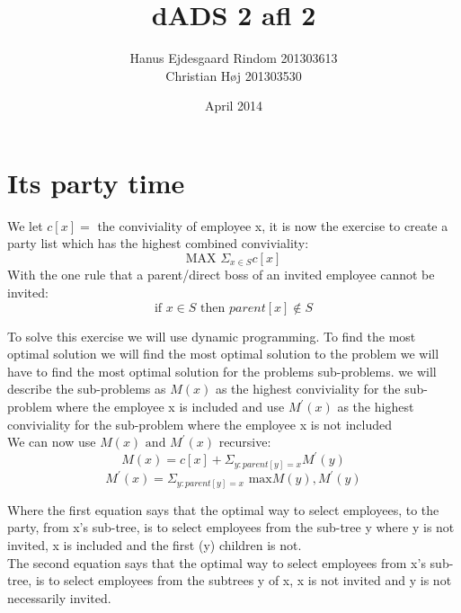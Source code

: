 \documentclass{article}
\title{dADS 2 afl 2}
\author{Hanus Ejdesgaard Rindom 201303613\\
Christian Høj 201303530}
\date{April 2014}
\begin{document}
\maketitle

\section{Its party time}
We let $ c[x]= $ the conviviality of employee x, it is now the exercise to create a party list which has the highest combined conviviality:
$$ \text{MAX } \Sigma _{x \in S} c[x] $$
With the one rule that a parent/direct boss of an invited employee cannot be invited:
$$ \text{if } x \in S \text{ then } parent[x] \notin S $$

To solve this exercise we will use dynamic programming. To find the most optimal solution we will find the most optimal solution to the problem we will have to find the most optimal solution for the problems sub-problems.
we will describe the sub-problems as $ M(x) $ as the highest conviviality for the sub-problem where the employee x is included and use $ M^{'}(x) $  as the highest conviviality for the sub-problem where the employee x is not included\\
We can now use $ M(x) \text{ and } M^{'}(x) $ recursive:
$$ M(x) = c[x] + \Sigma _{y:parent[y] = x} M^{'}(y) $$
$$ M^{'}(x) = \Sigma _{y:parent[y] = x} \text{ max} { M(y),M^{'}(y) } $$

Where the first equation says that the optimal way to select employees, to the party, from x's sub-tree, is to select employees from the sub-tree y where y is not invited, x is included and the first (y) children is not.\\
The second equation says that the optimal way to select employees from x's sub-tree, is to select employees from the subtrees y of x, x is not invited and y is not necessarily invited.
\end{document}
